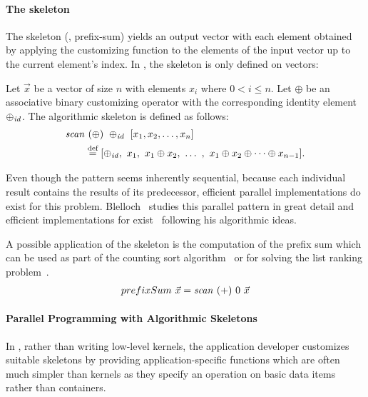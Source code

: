 \paragraph{The \scan skeleton}
The \scan skeleton (\aka, prefix-sum) yields an output vector with each element obtained by applying the customizing function to the elements of the input vector up to the current element's index.
In \SkelCL, the \scan skeleton is only defined on vectors:
\begin{definition}
  \label{definition:scan}
  Let $\vec{x}$ be a vector of size $n$ with elements $x_i$ where $0 < i \leq n$.
  Let $\oplus$ be an associative binary customizing operator with the corresponding identity element $\oplus_{\text{\textit{id}}}$.
  The algorithmic skeleton \scan is defined as follows:
  \begin{equation*}
    \begin{split}
      \text{\textit{scan}}&\ (\oplus)\ \oplus_{\text{\textit{id}}}\ [x_1, x_2, \dots, x_n] \\
      &\stackrel{\textrm{\scriptsize def}}{=} [\oplus_{\text{\textit{id}}},\ x_1,\ x_1 \oplus x_2,\ \dots\ ,\ x_1 \oplus x_2 \oplus \cdots \oplus x_{n-1}] .
    \end{split}
  \end{equation*}
\end{definition}
\noindent
Even though the \scan pattern seems inherently sequential, because each individual result contains the results of its predecessor, efficient parallel implementations do exist for this problem.
Blelloch~\cite{Blelloch1991} studies this parallel pattern in great detail and efficient implementations for \GPUs exist~\cite{HarrisSeOw2007} following his algorithmic ideas.

A possible application of the \scan skeleton is the computation of the prefix sum which can be used as part of the counting sort algorithm~\cite{Knuth1998} or for solving the list ranking problem~\cite{ColeVi1989}.
\begin{align*}
  prefixSum\ \vec{x} = \text{\textit{scan}}\ (+)\ 0\ \vec{x}
\end{align*}

\paragraph{Parallel Programming with Algorithmic Skeletons}
In \SkelCL, rather than writing low-level kernels, the application developer customizes suitable skeletons by providing application-specific functions which are often much simpler than kernels as they specify an operation on basic data items rather than containers.

